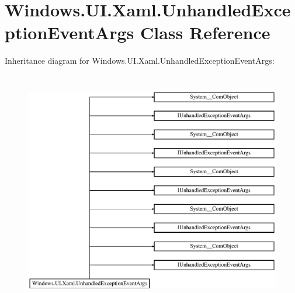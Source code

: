 \hypertarget{class_windows_1_1_u_i_1_1_xaml_1_1_unhandled_exception_event_args}{}\section{Windows.\+U\+I.\+Xaml.\+Unhandled\+Exception\+Event\+Args Class Reference}
\label{class_windows_1_1_u_i_1_1_xaml_1_1_unhandled_exception_event_args}
Inheritance diagram for Windows.\+U\+I.\+Xaml.\+Unhandled\+Exception\+Event\+Args\+:\begin{figure}[H]
\begin{center}
\leavevmode
\includegraphics[height=10.440678cm]{class_windows_1_1_u_i_1_1_xaml_1_1_unhandled_exception_event_args}
\end{center}
\end{figure}
